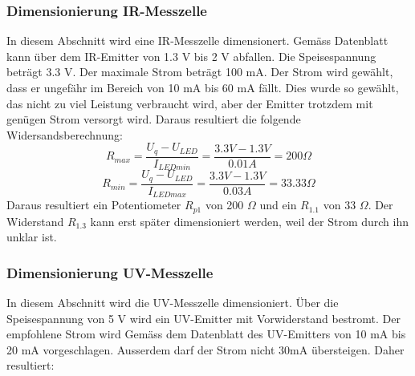 \documentclass[main.tex]{subfiles} %
\begin{document}




\subsubsection*{Dimensionierung IR-Messzelle}
In diesem Abschnitt wird eine IR-Messzelle dimensionert. Gemäss Datenblatt kann über dem IR-Emitter von 1.3 V bis 2 V
abfallen. Die Speisespannung beträgt 3.3 V. Der maximale Strom beträgt 100 mA. Der Strom wird gewählt, dass er ungefähr im 
Bereich von 10 mA bis 60 mA fällt. Dies wurde so gewählt, das nicht zu viel Leistung verbraucht wird, aber der Emitter trotzdem 
mit genügen Strom versorgt wird. Daraus resultiert die folgende Widersandsberechnung:
\[
    R_{max} = \frac{U_q - U_{LED}}{I_{LEDmin}} = \frac{3.3 V - 1.3 V}{0.01A} = 200 \Omega
\]
\[
    R_{min} = \frac{U_q - U_{LED}}{I_{LEDmax}} = \frac{3.3 V - 1.3 V}{0.03A} = 33.33 \Omega
\]
Daraus resultiert ein Potentiometer $R_{p1}$ von 200 $\Omega$ und ein $R_{1.1}$ von 33 $\Omega$.
Der Widerstand $R_{1.3}$ kann erst später dimensioniert werden, weil der Strom durch ihn unklar ist.


\subsubsection*{Dimensionierung UV-Messzelle}
In diesem Abschnitt wird die UV-Messzelle dimensioniert.
Über die Speisespannung von 5 V wird ein UV-Emitter mit Vorwiderstand bestromt. Der empfohlene Strom
wird Gemäss dem Datenblatt des UV-Emitters von 10 mA bis 20 mA vorgeschlagen. Ausserdem darf der Strom nicht 
30mA übersteigen. Daher resultiert: 
\end{document}
